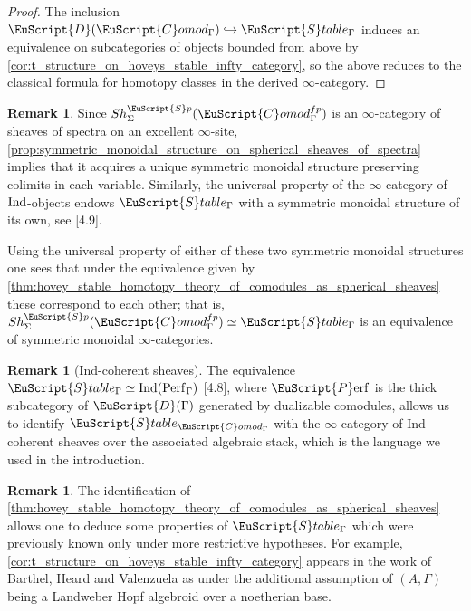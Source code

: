 \documentclass[oneside,a4paper]{amsart}
\newcommand{\euscr}[1]{\EuScript{#1}} %
\newcommand{\dcat}{\euscr{D}} %
\newcommand{\Ind}{\textnormal{Ind}} %
\newcommand{\spectra}{\euscr{S}p} %
\newcommand{\Comod}{\euscr{C}omod} %
\newcommand{\ComodGamma}{\Comod_{\Gamma}} %
\newcommand{\Perf}{\euscr{P}\mathrm{erf}} %
\theoremstyle{plain}
\theoremstyle{definition}
\newtheorem{rem}[thm]{Remark}
\theoremstyle{remark}
\begin{document}
\begin{proof}
The inclusion $\dcat(\ComodGamma) \hookrightarrow \euscr{S}table_{\Gamma}$ induces an equivalence on subcategories of objects bounded from above by \cref{cor:t_structure_on_hoveys_stable_infty_category}, so the above reduces to the classical formula for homotopy classes in the derived $\infty$-category.
\end{proof}

\begin{rem}
Since $Sh_{\Sigma}^{\spectra}(\ComodGamma^{fp})$ is an $\infty$-category of sheaves of spectra on an excellent $\infty$-site, \cref{prop:symmetric_monoidal_structure_on_spherical_sheaves_of_spectra} implies that it acquires a unique symmetric monoidal structure preserving colimits in each variable. Similarly, the universal property of the $\infty$-category of $\Ind$-objects endows $\euscr{S}table_{\Gamma}$ with a symmetric monoidal structure of its own, see \cite{barthel2015local}[4.9]. 

Using the universal property of either of these two symmetric monoidal structures one sees that under the equivalence given by \cref{thm:hovey_stable_homotopy_theory_of_comodules_as_spherical_sheaves} these correspond to each other; that is, $Sh_{\Sigma}^{\spectra}(\ComodGamma^{fp}) \simeq \euscr{S}table_{\Gamma}$ is an equivalence of symmetric monoidal $\infty$-categories. 
\end{rem}

\begin{rem}[$\mathrm{Ind}$-coherent sheaves]
The equivalence $\euscr{S}table_{\Gamma} \simeq \mathrm{Ind}(\mathrm{Perf}_{\Gamma})$ \cite{barthel2015local}[4.8], where $\Perf$ is the thick subcategory of $\dcat(\Gamma)$ generated by dualizable comodules, allows us to identify $\euscr{S}table_{\ComodGamma}$ with the $\infty$-category of $\mathrm{Ind}$-coherent sheaves over the associated algebraic stack, which is the language we used in the introduction.  
\end{rem}

\begin{rem}
The identification of \cref{thm:hovey_stable_homotopy_theory_of_comodules_as_spherical_sheaves} allows one to deduce some properties of $\euscr{S}table_{\Gamma}$ which were previously known only under more restrictive hypotheses. For example, \cref{cor:t_structure_on_hoveys_stable_infty_category} appears in the work of Barthel, Heard and Valenzuela as \cite[4.17]{barthel2015local} under the additional assumption of $(A, \Gamma)$ being a Landweber Hopf algebroid over a noetherian base. 
\end{rem}
\end{document}

